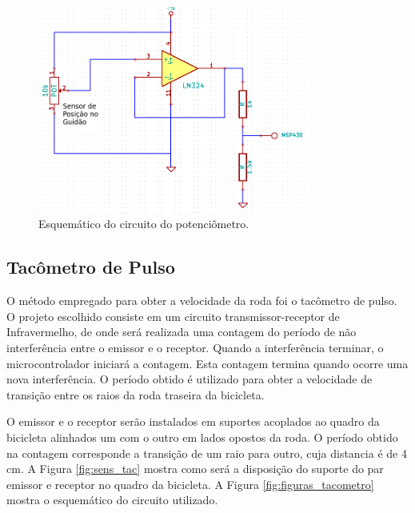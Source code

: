 \begin{figure}[h]
  \centering
  \includegraphics[width=0.8\textwidth]
      {figuras/potenciometro.png}
  \caption{Esquemático do circuito do potenciômetro.}
  \label{fig:circ_pot}
\end{figure}

\subsection{Tacômetro de Pulso} %
\label{sub:tac_metro}

O método empregado para obter a velocidade da roda foi o tacômetro de pulso. O projeto escolhido consiste em um circuito transmissor-receptor de Infravermelho, de onde será realizada uma contagem do período de não interferência entre o emissor e o receptor. Quando a interferência terminar, o microcontrolador iniciará a contagem. Esta contagem termina quando ocorre uma nova interferência. O período obtido é utilizado para obter a velocidade de transição entre os raios da roda traseira da bicicleta.

O emissor e o receptor serão instalados em suportes acoplados ao quadro da bicicleta alinhados um com o outro em lados opostos da roda. O período obtido na contagem corresponde a transição de um raio para outro, cuja distancia é de 4 cm. A Figura \ref{fig:sens_tac} mostra como será a disposição do suporte do par emissor e receptor no quadro da bicicleta. A Figura \ref{fig:figuras_tacometro} mostra o esquemático do circuito utilizado.

